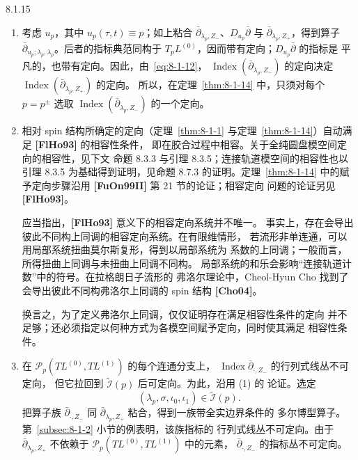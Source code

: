 \begin{remark}{8.1.15}\label{rem:8-1-15}
\begin{enumerate}[label=(\arabic*),leftmargin=2.8em]
\item 考虑 $u_p$，其中 $u_p(\tau,t)\equiv p$；如上粘合
$\bar\partial_{\lambda_p,Z_-}$、$D_{u_p}\bar\partial$ 与
$\bar\partial_{\lambda_p,Z_+}$，得到算子
$\bar\partial_{u_p;\lambda_p,\lambda_p}$。后者的指标典范同构于
$T_pL^{(0)}$，因而带有定向；$D_{u_p}\bar\partial$ 的指标是
平凡的，也带有定向。因此，由~\eqref{eq:8-1-12}，
$\operatorname{Index}(\bar\partial_{\lambda_p,Z_-})$ 的定向决定
$\operatorname{Index}(\bar\partial_{\lambda_p,Z_+})$ 的定向。
所以，在定理~\ref{thm:8-1-14} 中，只须对每个 $p=p^\pm$
选取 $\operatorname{Index}(\bar\partial_{\lambda_p,Z_-})$ 的一个定向。%

\item 相对 spin 结构所确定的定向（定理~\ref{thm:8-1-1}
与定理~\ref{thm:8-1-14}）自动满足 \textbf{[FlHo93]} 的相容性条件，
即在胶合过程中相容。关于全纯圆盘模空间定向的相容性，见下文
命题 8.3.3 与引理 8.3.5；连接轨道模空间的相容性也以引理 8.3.5
为基础得到证明，见命题 8.7.3 的证明。定理~\ref{thm:8-1-14}
中的赋予定向步骤沿用 \textbf{[FuOn99II]} 第 21 节的论证；相容定向
问题的论证另见 \textbf{[FlHo93]}。

应当指出，\textbf{[FlHo93]} 意义下的相容定向系统并不唯一。
事实上，存在会导出彼此不同构上同调的相容定向系统。在有限维情形，
若流形非单连通，可以用局部系统扭曲莫尔斯复形，得到以局部系统为
系数的上同调；一般而言，所得扭曲上同调与未扭曲上同调不同构。
局部系统的和乐会影响“连接轨道计数”中的符号。在拉格朗日子流形的
弗洛尔理论中，Cheol-Hyun Cho 找到了会导出彼此不同构弗洛尔上同调的
spin 结构 \textbf{[Cho04]}。

换言之，为了定义弗洛尔上同调，仅仅证明存在满足相容性条件的定向
并不足够；还必须指定以何种方式为各模空间赋予定向，同时使其满足
相容性条件。

\item 在 $\mathcal P_p(TL^{(0)},TL^{(1)})$ 的每个连通分支上，
$\operatorname{Index}\bar\partial_{\cdot,Z_-}$ 的行列式线丛不可定向，
但它拉回到 $\widetilde{\mathcal I}(p)$ 后可定向。为此，沿用 (1) 的
论证。选定
\[
 (\lambda_p,\sigma,\iota_0,\iota_1)
 \in\widetilde{\mathcal I}(p).
\]
把算子族 $\bar\partial_{\cdot,Z_-}$ 同
$\bar\partial_{\lambda_p,Z_+}$ 粘合，得到一族带全实边界条件的
多尔博型算子。第~\ref{subsec:8-1-2} 小节的例表明，该族指标的
行列式线丛不可定向。由于
$\bar\partial_{\lambda_p,Z_+}$ 不依赖于
$\mathcal P_p(TL^{(0)},TL^{(1)})$ 中的元素，
$\bar\partial_{\cdot,Z_-}$ 的指标丛不可定向。


\end{enumerate}
\end{remark}
